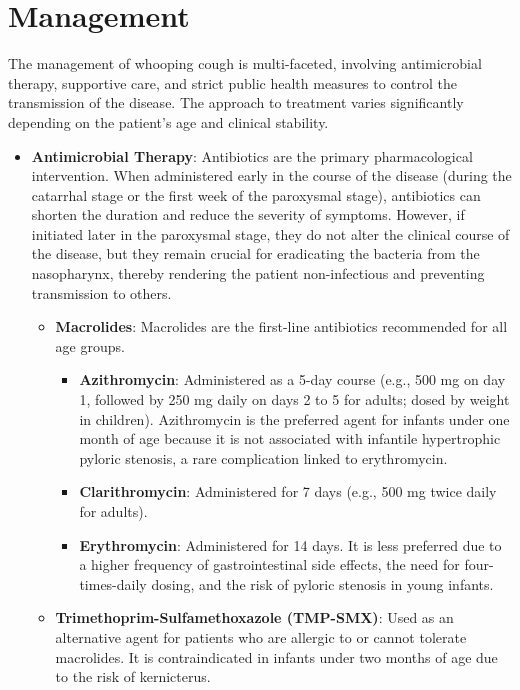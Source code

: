\section*{Management}
The management of whooping cough is multi-faceted, involving antimicrobial therapy, supportive care, and strict public health measures to control the transmission of the disease. The approach to treatment varies significantly depending on the patient's age and clinical stability.
\begin{itemize}
    \item \textbf{Antimicrobial Therapy}: Antibiotics are the primary pharmacological intervention. When administered early in the course of the disease (during the catarrhal stage or the first week of the paroxysmal stage), antibiotics can shorten the duration and reduce the severity of symptoms. However, if initiated later in the paroxysmal stage, they do not alter the clinical course of the disease, but they remain crucial for eradicating the bacteria from the nasopharynx, thereby rendering the patient non-infectious and preventing transmission to others.
    \begin{itemize}
        \item \textbf{Macrolides}: Macrolides are the first-line antibiotics recommended for all age groups.
        \begin{itemize}
            \item \textbf{Azithromycin}: Administered as a 5-day course (e.g., 500 mg on day 1, followed by 250 mg daily on days 2 to 5 for adults; dosed by weight in children). Azithromycin is the preferred agent for infants under one month of age because it is not associated with infantile hypertrophic pyloric stenosis, a rare complication linked to erythromycin.
            \item \textbf{Clarithromycin}: Administered for 7 days (e.g., 500 mg twice daily for adults).
            \item \textbf{Erythromycin}: Administered for 14 days. It is less preferred due to a higher frequency of gastrointestinal side effects, the need for four-times-daily dosing, and the risk of pyloric stenosis in young infants.
        \end{itemize}
        \item \textbf{Trimethoprim-Sulfamethoxazole (TMP-SMX)}: Used as an alternative agent for patients who are allergic to or cannot tolerate macrolides. It is contraindicated in infants under two months of age due to the risk of kernicterus.
    \end{itemize}


\end{itemize}
